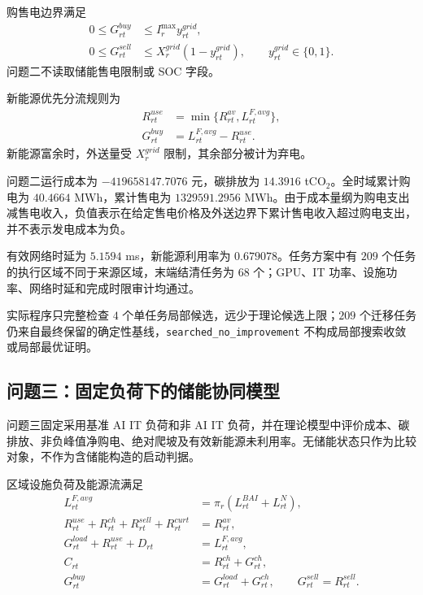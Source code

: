 购售电边界满足
\begin{align}
0\le G_{rt}^{buy}&\le I_r^{\max}y_{rt}^{grid},\\
0\le G_{rt}^{sell}&\le X_r^{grid}(1-y_{rt}^{grid}),
\qquad y_{rt}^{grid}\in\{0,1\}.
\end{align}
问题二不读取储能售电限制或 SOC 字段。

新能源优先分流规则为
\begin{align}
R_{rt}^{use}&=\min\{R_{rt}^{av},L_{rt}^{F,avg}\},\\
G_{rt}^{buy}&=L_{rt}^{F,avg}-R_{rt}^{use}.
\end{align}
新能源富余时，外送量受 $X_r^{grid}$ 限制，其余部分被计为弃电。

问题二运行成本为 $-419658147.7076$ 元，碳排放为 $14.3916$ tCO$_2$。全时域累计购电为 $40.4664$ MWh，累计售电为 $1329591.2956$ MWh。由于成本量纲为购电支出减售电收入，负值表示在给定售电价格及外送边界下累计售电收入超过购电支出，并不表示发电成本为负。

有效网络时延为 $5.1594$ ms，新能源利用率为 $0.679078$。任务方案中有 $209$ 个任务的执行区域不同于来源区域，末端结清任务为 $68$ 个；GPU、IT 功率、设施功率、网络时延和完成时限审计均通过。

实际程序只完整检查 $4$ 个单任务局部候选，远少于理论候选上限；$209$ 个迁移任务仍来自最终保留的确定性基线，\texttt{searched\_no\_improvement} 不构成局部搜索收敛或局部最优证明。

\subsection{问题三：固定负荷下的储能协同模型}

问题三固定采用基准 AI IT 负荷和非 AI IT 负荷，并在理论模型中评价成本、碳排放、非负峰值净购电、绝对爬坡及有效新能源未利用率。无储能状态只作为比较对象，不作为含储能构造的启动判据。

区域设施负荷及能源流满足
\begin{align}
L_{rt}^{F,avg}&=\pi_r(L_{rt}^{BAI}+L_{rt}^{N}),\\
R_{rt}^{use}+R_{rt}^{ch}+R_{rt}^{sell}+R_{rt}^{curt}&=R_{rt}^{av},\\
G_{rt}^{load}+R_{rt}^{use}+D_{rt}&=L_{rt}^{F,avg},\\
C_{rt}&=R_{rt}^{ch}+G_{rt}^{ch},\\
G_{rt}^{buy}&=G_{rt}^{load}+G_{rt}^{ch},\qquad
G_{rt}^{sell}=R_{rt}^{sell}.
\end{align}

